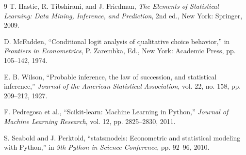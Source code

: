 \begin{thebibliography}{9}
T. Hastie, R. Tibshirani, and J. Friedman,
\emph{The Elements of Statistical Learning: Data Mining, Inference, and Prediction}, 2nd ed.,
New York: Springer, 2009.

D. McFadden,
``Conditional logit analysis of qualitative choice behavior,''
in \emph{Frontiers in Econometrics}, P. Zarembka, Ed., New York: Academic Press, pp. 105--142, 1974.

E. B. Wilson,
``Probable inference, the law of succession, and statistical inference,''
\emph{Journal of the American Statistical Association}, vol. 22, no. 158, pp. 209--212, 1927.

F. Pedregosa et al.,
``Scikit-learn: Machine Learning in Python,''
\emph{Journal of Machine Learning Research}, vol. 12, pp. 2825--2830, 2011.

S. Seabold and J. Perktold,
``statsmodels: Econometric and statistical modeling with Python,''
in \emph{9th Python in Science Conference}, pp. 92--96, 2010.

\end{thebibliography}
